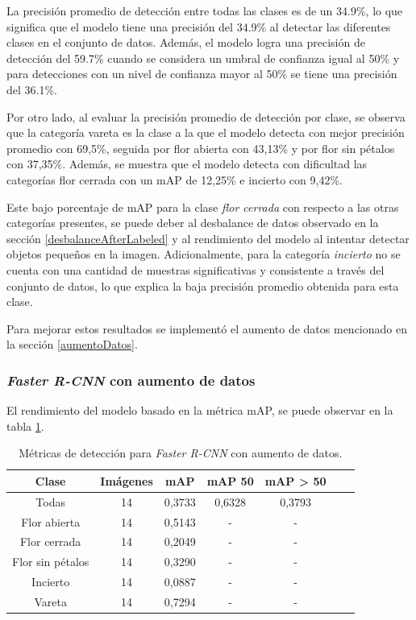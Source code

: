La precisión promedio de detección entre todas las clases es de un 34.9\%, lo que significa que el modelo tiene una precisión del 34.9\% al detectar las diferentes clases en el conjunto de datos. Además, el modelo logra una precisión de detección del 59.7\% cuando se considera un umbral de confianza igual al 50\% y para detecciones con un nivel de confianza mayor al 50\% se tiene una precisión del 36.1\%.

Por otro lado, al evaluar la precisión promedio de detección por clase, se observa que la categoría vareta es la clase a la que el modelo detecta con mejor precisión promedio con 69,5\%, seguida por flor abierta con 43,13\% y por flor sin pétalos con 37,35\%. Además, se muestra que el modelo detecta con dificultad las categorías flor cerrada con un mAP de 12,25\% e incierto con 9,42\%.

Este bajo porcentaje de mAP para la clase \textit{flor cerrada} con respecto a las otras categorías presentes, se puede deber al desbalance de datos observado en la sección \ref{desbalanceAfterLabeled} y al rendimiento del modelo al intentar detectar objetos pequeños en la imagen. Adicionalmente, para la categoría \textit{incierto} no se cuenta con una cantidad de muestras significativas y consistente a través del conjunto de datos, lo que explica la baja precisión promedio obtenida para esta clase.

Para mejorar estos resultados se implementó el aumento de datos mencionado en la sección \ref{aumentoDatos}.

\subsubsection{\textit{Faster R-CNN} con aumento de datos}

El rendimiento del modelo basado en la métrica mAP, se puede observar en la tabla \ref{tab:resultadosFasterConAug}. 

\begin{table}[h]
	\centering
	\caption{Métricas de detección para \textit{Faster R-CNN} con aumento de datos.}
	\begin{tabular}{c c c c c c c}    
		\toprule
		\textbf{Clase}&\textbf{Imágenes}&\textbf{mAP}&\textbf{mAP 50}&\textbf{mAP > 50}\\
		\midrule
		Todas & 14 & 0,3733 & 0,6328 & 0,3793\\
		Flor abierta & 14 & 0,5143 & - & - \\
		Flor cerrada & 14 & 0,2049 & - & - \\
		Flor sin pétalos & 14 & 0,3290 & - & - \\
		Incierto & 14 & 0,0887 & - & - \\
		Vareta & 14 & 0,7294 & - & - \\		
		\bottomrule
		\hline
	\end{tabular}
	\label{tab:resultadosFasterConAug}
\end{table}

